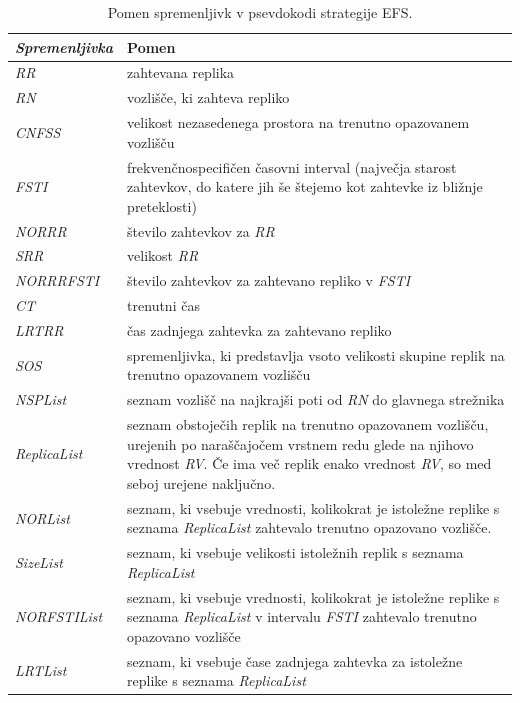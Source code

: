 \documentclass[a4paper, 12pt]{book}
\begin{document}
\begin{table}
\small
  \begin{center}
    \begin{tabulary}{1.0\textwidth}{ >{\itshape}p{6.8em} p{26em}}
      \textnormal{Spremenljivka} & Pomen \\
      \hline
      RR & zahtevana replika \\
      RN &  vozlišče, ki zahteva repliko \\
      CNFSS & velikost nezasedenega prostora na trenutno opazovanem
          \mbox{vozlišču} \\
      FSTI & frekvenčnospecifičen časovni interval (največja starost
         zahtevkov, do katere jih še štejemo kot zahtevke iz bližnje
         preteklosti) \\
      NORRR & število zahtevkov za \textit{RR} \\
      SRR & velikost \textit{RR} \\
      NORRRFSTI & število zahtevkov za zahtevano repliko
          v \textit{FSTI} \\
      CT & trenutni čas \\
      LRTRR & čas zadnjega zahtevka za zahtevano repliko \\
      SOS & spremenljivka, ki predstavlja vsoto velikosti skupine replik na
          trenutno opazovanem vozlišču \\
      NSPList & seznam vozlišč na najkrajši poti od \textit{RN} do
          glavnega strežnika \\
      ReplicaList & seznam obstoječih replik na trenutno opazovanem vozlišču,
          urejenih po naraščajočem vrstnem redu glede na njihovo vrednost
          \textit{RV}. Če ima več replik enako vrednost \textit{RV}, so med
          seboj urejene naključno. \\
      NORList & seznam, ki vsebuje vrednosti, kolikokrat je istoležne
          replike s seznama \textit{ReplicaList} zahtevalo
          trenutno opazovano vozlišče. \\
      SizeList & seznam, ki vsebuje velikosti istoležnih replik s seznama
          \textit{ReplicaList} \\
      NORFSTIList & seznam, ki vsebuje vrednosti, kolikokrat je istoležne
          replike s seznama \textit{ReplicaList} v intervalu \textit{FSTI}
          zahtevalo trenutno opazovano vozlišče  \\
      LRTList & seznam, ki vsebuje čase zadnjega zahtevka za istoležne
          replike s seznama \textit{ReplicaList}
    \end{tabulary}
 \end{center}

  \caption{Pomen spremenljivk v psevdokodi strategije EFS.}
  \label{tbl:EFS_vars}
\end{table}
\end{document}
